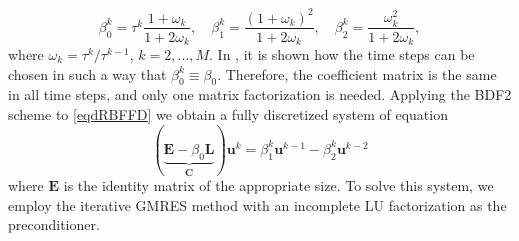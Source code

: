 \documentclass{UUThesisTemplate}
\begin{document}
\begin{equation}
\label{eq:timeweights}
\beta_0^k = \tau^k\frac{1+\omega_k}{1+2\omega_k},\quad
\beta_1^k = \frac{(1+\omega_k)^2}{1+2\omega_k},\quad
\beta_2^k = \frac{\omega_k^2}{1+2\omega_k},
\end{equation}
where $\omega_k=\tau^k/\tau^{k-1}$, $k=2,\ldots,M$. In \cite{larsson2008multi}, it is shown how the time steps can be chosen in such a way that $\beta_0^k\equiv \beta_0$. Therefore, the coefficient matrix is the same in all time steps, and only one matrix factorization is needed. Applying the BDF2 scheme to \eqref{eqdRBFFD} we obtain a fully discretized system of equation
\begin{equation}
(\underbrace{\mathbf{E}-\beta_0 \mathbf{L}}_{\mathbf{C}})
\mathbf{u}^k
= \beta_1^k\mathbf{u}^{k-1} - \beta_2^k\mathbf{u}^{k-2}
\label{impl:system}
\end{equation}
where $\mathbf{E}$ is the identity matrix of the appropriate size. To solve this system, we employ the iterative GMRES method with an incomplete LU factorization as the preconditioner.
\end{document}
